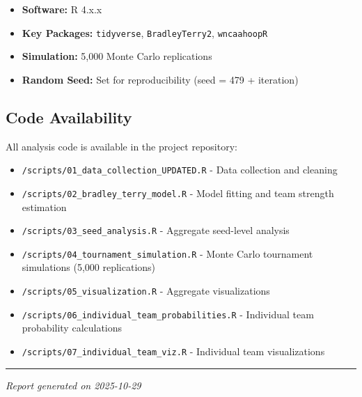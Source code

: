 \documentclass[
]{article}
\providecommand{\tightlist}{%
  \setlength{\itemsep}{0pt}\setlength{\parskip}{0pt}}
\begin{document}
\begin{itemize}
\tightlist
\item
  \textbf{Software:} R 4.x.x
\item
  \textbf{Key Packages:} \texttt{tidyverse}, \texttt{BradleyTerry2},
  \texttt{wncaahoopR}
\item
  \textbf{Simulation:} 5,000 Monte Carlo replications
\item
  \textbf{Random Seed:} Set for reproducibility (seed = 479 + iteration)
\end{itemize}

\subsection{Code Availability}\label{code-availability}

All analysis code is available in the project repository:

\begin{itemize}
\tightlist
\item
  \texttt{/scripts/01\_data\_collection\_UPDATED.R} - Data collection
  and cleaning
\item
  \texttt{/scripts/02\_bradley\_terry\_model.R} - Model fitting and team
  strength estimation
\item
  \texttt{/scripts/03\_seed\_analysis.R} - Aggregate seed-level analysis
\item
  \texttt{/scripts/04\_tournament\_simulation.R} - Monte Carlo
  tournament simulations (5,000 replications)
\item
  \texttt{/scripts/05\_visualization.R} - Aggregate visualizations
\item
  \texttt{/scripts/06\_individual\_team\_probabilities.R} - Individual
  team probability calculations
\item
  \texttt{/scripts/07\_individual\_team\_viz.R} - Individual team
  visualizations
\end{itemize}

\begin{center}\rule{0.5\linewidth}{0.5pt}\end{center}

\emph{Report generated on 2025-10-29}
\end{document}
